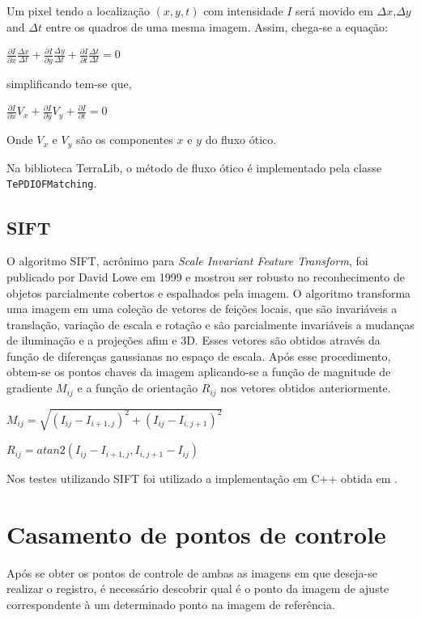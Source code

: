 \documentclass[9pt, a4paper, nofonttune, journal]{IEEEtran}
\begin{document}
Um pixel tendo a localização $(x,y,t)$ com intensidade $I$ será movido em $\Delta x$,$\Delta y$ and $\Delta t$ entre os quadros de uma mesma imagem.
Assim, chega-se a equação:

\begin{center}
$\frac{\partial I}{\partial x}\frac{\Delta x}{\Delta t}+\frac{\partial I}{\partial y}\frac{\Delta y}{\Delta t}+\frac{\partial I}{\partial t}\frac{\Delta t}{\Delta t} = 0 $\end{center}
simplificando tem-se que,
\begin{center}
$\frac{\partial I}{\partial x}V_x+\frac{\partial I}{\partial y}V_y+\frac{\partial I}{\partial t} = 0$\end{center}
Onde $V_x$ e $V_y$ são os componentes $x$ e $y$ do fluxo ótico.

Na biblioteca TerraLib, o método de fluxo ótico é implementado pela classe \texttt{TePDIOFMatching}.

\subsection{SIFT}

O algoritmo SIFT, acrônimo para \textit{Scale Invariant Feature Transform}, foi publicado por David Lowe em 1999 
e mostrou ser robusto no reconhecimento de objetos parcialmente cobertos e espalhados pela imagem.
O algoritmo transforma uma imagem em uma coleção de vetores de feições locais, que são invariáveis a translação, variação de escala e rotação 
e são parcialmente invariáveis a mudanças de iluminação e a projeções afim e 3D.
Esses vetores são obtidos através da função de diferenças gaussianas no espaço de escala.
Após esse procedimento, obtem-se os pontos chaves da imagem aplicando-se a função de magnitude de gradiente $M_{ij}$ e
a função de orientação $R_{ij}$ nos vetores obtidos anteriormente. \cite{Lowe2}

\begin{center}
$M_{ij}=\sqrt{(I_{ij}-I_{i+1,j})^{2}+(I_{ij}-I_{i,j+1})^{2}}$\end{center}
\begin{center}
$R_{ij}=atan2(I_{ij}-I_{i+1,j},I_{i,j+1}-I_{ij})$\end{center}



Nos testes utilizando SIFT foi utilizado a implementação em C++ obtida em \cite{Vedaldi}.

\section{Casamento de pontos de controle}
Após se obter os pontos de controle de ambas as imagens em que deseja-se realizar o registro,
é necessário descobrir qual é o ponto da imagem de ajuste correspondente à um determinado ponto na imagem de referência.
\end{document}
